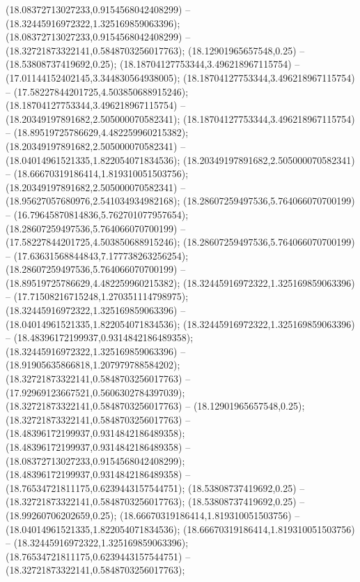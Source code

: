  (18.08372713027233,0.9154568042408299) -- (18.32445916972322,1.325169859063396);
 (18.08372713027233,0.9154568042408299) -- (18.32721873322141,0.5848703256017763);
 (18.12901965657548,0.25) -- (18.53808737419692,0.25);
 (18.18704127753344,3.496218967115754) -- (17.01144152402145,3.344830564938005);
 (18.18704127753344,3.496218967115754) -- (17.58227844201725,4.503850688915246);
 (18.18704127753344,3.496218967115754) -- (18.20349197891682,2.505000070582341);
 (18.18704127753344,3.496218967115754) -- (18.89519725786629,4.482259960215382);
 (18.20349197891682,2.505000070582341) -- (18.04014961521335,1.822054071834536);
 (18.20349197891682,2.505000070582341) -- (18.66670319186414,1.819310051503756);
 (18.20349197891682,2.505000070582341) -- (18.95627057680976,2.541034934982168);
 (18.28607259497536,5.764066070700199) -- (16.79645870814836,5.762701077957654);
 (18.28607259497536,5.764066070700199) -- (17.58227844201725,4.503850688915246);
 (18.28607259497536,5.764066070700199) -- (17.63631568844843,7.177738263256254);
 (18.28607259497536,5.764066070700199) -- (18.89519725786629,4.482259960215382);
 (18.32445916972322,1.325169859063396) -- (17.71508216715248,1.270351114798975);
 (18.32445916972322,1.325169859063396) -- (18.04014961521335,1.822054071834536);
 (18.32445916972322,1.325169859063396) -- (18.48396172199937,0.9314842186489358);
 (18.32445916972322,1.325169859063396) -- (18.91905635866818,1.207979788584202);
 (18.32721873322141,0.5848703256017763) -- (17.92969123667521,0.5606302784397039);
 (18.32721873322141,0.5848703256017763) -- (18.12901965657548,0.25);
 (18.32721873322141,0.5848703256017763) -- (18.48396172199937,0.9314842186489358);
 (18.48396172199937,0.9314842186489358) -- (18.08372713027233,0.9154568042408299);
 (18.48396172199937,0.9314842186489358) -- (18.76534721811175,0.6239443157544751);
 (18.53808737419692,0.25) -- (18.32721873322141,0.5848703256017763);
 (18.53808737419692,0.25) -- (18.99260706202659,0.25);
 (18.66670319186414,1.819310051503756) -- (18.04014961521335,1.822054071834536);
 (18.66670319186414,1.819310051503756) -- (18.32445916972322,1.325169859063396);
 (18.76534721811175,0.6239443157544751) -- (18.32721873322141,0.5848703256017763);
